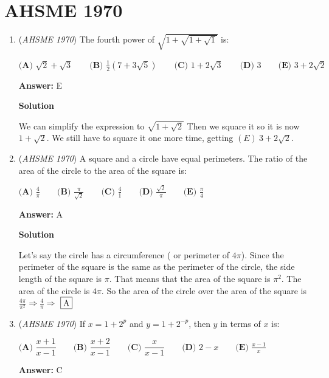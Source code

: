 \section{AHSME 1970}
        \begin{enumerate}
        	\item (\textit{AHSME 1970}) The fourth power of $\sqrt{1+\sqrt{1+\sqrt{1}}}$ is:


 $\textbf{(A) }\sqrt{2}+\sqrt{3}\qquad \textbf{(B) }\frac{1}{2}(7+3\sqrt{5})\qquad \textbf{(C) }1+2\sqrt{3}\qquad \textbf{(D) }3\qquad \textbf{(E) }3+2\sqrt{2}$

 \textbf{Answer: }E



\textbf{Solution}

We can simplify the expression to $\sqrt{1+\sqrt{2}}$ Then we square it so it is now $1+\sqrt{2}$. We still have to square it one more time, getting $\boxed{(E)\ 3+2\sqrt{2}}$.

 


	\item (\textit{AHSME 1970}) A square and a circle have equal perimeters. The ratio of the area of the circle to the area of the square is:


 $\textbf{(A) }\frac{4}{\pi}\qquad \textbf{(B) }\frac{\pi}{\sqrt{2}}\qquad \textbf{(C) }\frac{4}{1}\qquad \textbf{(D) }\frac{\sqrt{2}}{\pi}\qquad \textbf{(E) }\frac{\pi}{4}$

 \textbf{Answer: }A



\textbf{Solution}

Let's say the circle has a circumference ( or perimeter of $4\pi$). Since the perimeter of the square is the same as the perimeter of the circle, the side length of the square is $\pi$. That means that the area of the square is $\pi^2$. The area of the circle is $4\pi$. So the area of the circle over the area of the square is  $\frac{4\pi}{\pi^2} \Rightarrow \frac{4}{\pi} \Rightarrow$ $\fbox{A}$



	\item (\textit{AHSME 1970}) If $x=1+2^p$ and $y=1+2^{-p}$, then $y$ in terms of $x$ is:


 $\textbf{(A) }\dfrac{x+1}{x-1}\qquad \textbf{(B) }\dfrac{x+2}{x-1}\qquad \textbf{(C) }\dfrac{x}{x-1}\qquad \textbf{(D) }2-x\qquad \textbf{(E) }\frac{x-1}{x}$

 \textbf{Answer: }C




\end{enumerate}

